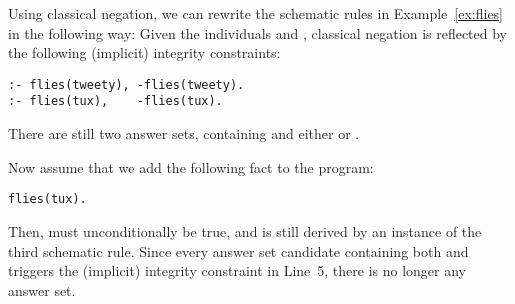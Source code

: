 \begin{example}\label{ex:flies:neg}
Using classical negation,
we can rewrite the schematic rules in Example~\ref{ex:flies}
in the following way:
%
% 
%
Given the individuals  and ,
classical negation is reflected by
the following (implicit) integrity constraints:%
%
\begin{lstlisting}[firstnumber=4]
:- flies(tweety), -flies(tweety).
:- flies(tux),    -flies(tux).
\end{lstlisting}
There are still two answer sets,
containing  and
either  or .

Now assume that we add the following fact to the program:
\begin{lstlisting}[numbers=none]
flies(tux).
\end{lstlisting}
Then,
 must unconditionally be true,
and  is still derived by
an instance of the third schematic rule.
Since every answer set candidate containing
both  and 
triggers
the (implicit) integrity constraint in Line~5,
there is no longer any answer set.
\eexample
\end{example}

